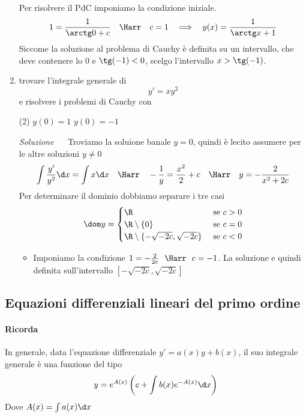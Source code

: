 \documentclass{article}
\newcommand{\se}{\text{ se }}
\begin{document}
\begin{enumerate}[label=\textbf{Esercizio 13.\arabic*.},itemindent=*]
Per risolvere il PdC imponiamo la condizione iniziale.
\[1=\frac{1}{\arctg 0 +c}~~~\Harr~~~c=1~~\implies~~y(x)=\frac{1}{\arctg x +1}\]
Siccome la soluzione al problema di Cauchy è definita su un intervallo, che deve contenere lo $0$ e $\tg (-1)<0$, scelgo l'intervallo $x>\tg(-1)$.
\item trovare l'integrale generale di 
\[
    y'=xy^2
\]
e risolvere i problemi di Cauchy con
\begin{tasks}(2)
    \task $y(0)=1$ \task $y(0)=-1$
\end{tasks}
\item[\textit{\large Soluzione~}]~ Troviamo la soluione banale $y=0$, quindi è lecito assumere per le altre soluzioni $y\neq 0$
\[\int \frac{y'}{y^2}\d x=\int x \d x~~~\Harr~~~-\frac{1}{y}=\frac{x^2}{2}+c~~~\Harr~~~y=-\frac{2}{x^2+2c}\]
Per determinare il dominio dobbiamo separare i tre casi
\[\dom y=\begin{cases}
    \R &\se c>0\\
    \R\setminus \{0\}&\se c=0\\
    \R\setminus \{-\sqrt{-2c}, \sqrt{-2c}\}&\se c<0
\end{cases}\]
\begin{itemize}
    \item Imponiamo la condizione $1=-\frac{2}{2c}~~\Harr~~c=-1$. La soluzione e quindi definita sull'intervallo $[-\sqrt{-2c}, \sqrt{-2c}]$
\end{itemize}
\end{enumerate}
\subsection*{Equazioni differenziali lineari del primo ordine}

\begin{lineframe}
    \paragraph*{Ricorda} In generale, data l'equazione differenziale $y'=a(x)y+b(x)$, il suo integrale generale è una funzione del tipo 
    \[y=e^{A(x)}\left( c+\int b(x)e^{-A(x)}\d x \right)\]
    Dove $A(x)=\int a(x)\d x$
\end{lineframe}
\end{document}
